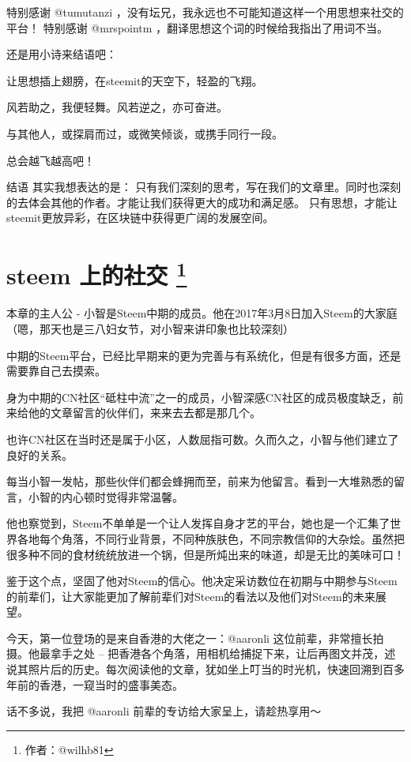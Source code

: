 \documentclass[]{ctexbook}
\begin{document}
特别感谢 @tumutanzi ，没有坛兄，我永远也不可能知道这样一个用思想来社交的平台！
特别感谢 @mrspointm ，翻译思想这个词的时候给我指出了用词不当。

还是用小诗来结语吧：

让思想插上翅膀，在steemit的天空下，轻盈的飞翔。

风若助之，我便轻舞。风若逆之，亦可奋进。

与其他人，或探肩而过，或微笑倾谈，或携手同行一段。

总会越飞越高吧！

结语
其实我想表达的是：
只有我们深刻的思考，写在我们的文章里。同时也深刻的去体会其他的作者。才能让我们获得更大的成功和满足感。
只有思想，才能让steemit更放异彩，在区块链中获得更广阔的发展空间。

\hypertarget{steem-}{%
\section[steem 上的社交 ]{\texorpdfstring{steem 上的社交 \footnote{作者：@wilhb81}}{steem 上的社交 }}\label{steem-}}

本章的主人公 - 小智是Steem中期的成员。他在2017年3月8日加入Steem的大家庭（嗯，那天也是三八妇女节，对小智来讲印象也比较深刻）

中期的Steem平台，已经比早期来的更为完善与有系统化，但是有很多方面，还是需要靠自己去摸索。

身为中期的CN社区``砥柱中流''之一的成员，小智深感CN社区的成员极度缺乏，前来给他的文章留言的伙伴们，来来去去都是那几个。

也许CN社区在当时还是属于小区，人数屈指可数。久而久之，小智与他们建立了良好的关系。

每当小智一发帖，那些伙伴们都会蜂拥而至，前来为他留言。看到一大堆熟悉的留言，小智的内心顿时觉得非常温馨。

他也察觉到，Steem不单单是一个让人发挥自身才艺的平台，她也是一个汇集了世界各地每个角落，不同行业背景，不同种族肤色，不同宗教信仰的大杂烩。虽然把很多种不同的食材统统放进一个锅，但是所炖出来的味道，却是无比的美味可口！

鉴于这个点，坚固了他对Steem的信心。他决定采访数位在初期与中期参与Steem的前辈们，让大家能更加了解前辈们对Steem的看法以及他们对Steem的未来展望。

今天，第一位登场的是来自香港的大佬之一：@aaronli 这位前辈，非常擅长拍摄。他最拿手之处 -- 把香港各个角落，用相机给捕捉下来，让后再图文并茂，述说其照片后的历史。每次阅读他的文章，犹如坐上叮当的时光机，快速回溯到百多年前的香港，一窥当时的盛事美态。

话不多说，我把 @aaronli 前辈的专访给大家呈上，请趁热享用～
\end{document}
